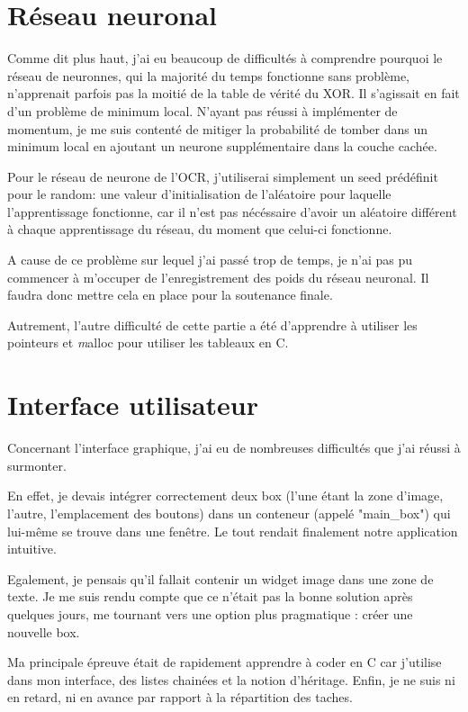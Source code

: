 \documentclass[12pt]{report}
\begin{document}
\section*{Réseau neuronal}

Comme dit plus haut, j'ai eu beaucoup de difficultés à comprendre pourquoi le réseau de neuronnes, qui la majorité du temps fonctionne sans problème, n'apprenait parfois pas la moitié de la table de vérité du XOR. Il s'agissait en fait d'un problème de minimum local. N'ayant pas réussi à implémenter de momentum, je me suis contenté de mitiger la probabilité de tomber dans un minimum local en ajoutant un neurone supplémentaire dans la couche cachée.

Pour le réseau de neurone de l'OCR, j'utiliserai simplement un seed prédéfinit pour le random: une valeur d'initialisation de l'aléatoire pour laquelle l'apprentissage fonctionne, car il n'est pas nécéssaire d'avoir un aléatoire différent à chaque apprentissage du réseau, du moment que celui-ci fonctionne.

A cause de ce problème sur lequel j'ai passé trop de temps, je n'ai pas pu commencer à m'occuper de l'enregistrement des poids du réseau neuronal. Il faudra donc mettre cela en place pour la soutenance finale.

Autrement, l'autre difficulté de cette partie a été d'apprendre à utiliser les pointeurs et \textit malloc pour utiliser les tableaux en C.

\section*{Interface utilisateur}

Concernant l’interface graphique, j’ai eu de nombreuses difficultés que j’ai réussi à surmonter. 

En effet, je devais intégrer correctement deux box (l’une étant la zone d’image, l’autre, l’emplacement des boutons) dans un conteneur (appelé "main\_box") qui lui-même se trouve dans une fenêtre. Le tout rendait finalement notre application intuitive.

Egalement, je pensais qu’il fallait contenir un widget image dans une zone de texte. Je me suis rendu compte que ce n’était pas la bonne solution après quelques jours, me tournant vers une option plus pragmatique : créer une nouvelle box.

Ma principale épreuve était de rapidement apprendre à coder en C car j’utilise dans mon interface, des listes chainées et la notion d’héritage.
Enfin, je ne suis ni en retard, ni en avance par rapport à la répartition des taches.
\end{document}
